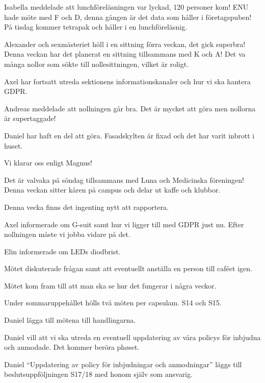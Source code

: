 \documentclass[10pt]{article}
\begin{document}
\begin{paragrafer}
\begin{paragrafer}
		Isabella meddelade att lunchföreläsningen var lyckad, 
		120 personer kom! ENU hade möte med F och D, denna 
		gången är det data som håller i företagspuben! På tisdag kommer 
		tetrapak och håller i en lunchföreläsnig.

		Alexander och sexmästeriet höll i en sittning förra veckan, det gick superbra! 
		Denna veckan har det planerat en sittning tillsammans med 
		K och A! Det va många nollor som sökte till nollesittningen, 
		vilket är roligt.

		Axel har fortsatt utreda sektionens informationskanaler och hur vi ska hantera GDPR. 

		Andreas meddelade att nollningen går bra. Det är mycket att göra men nollorna är supertaggade!

		Daniel har haft en del att göra. Fasadskylten är fixad och det har varit inbrott i huset.

		Vi klarar oss enligt Magnus!
				
		Det är valvaka på söndag tillsammans med Luna och Medicinska föreningen!
	    Denna veckan sitter kåren på campus och delar ut kaffe och klubbor.

				
		Denna vecka finns det ingenting nytt att rapportera.
						
	\end{paragrafer}
		
	Axel informerade om G-suit samt hur vi ligger till med GDPR just nu. Efter nollningen måste vi jobba vidare på det. 
	
	Elin informerade om LEDs diodbrist.

	Mötet diskuterade frågan samt att eventuellt anställa en person till caféet igen.

	Mötet kom fram till att man ska se hur det fungerar i några veckor.

	
	Under sommaruppehållet hölls två möten per capsulam. S14 och S15.

	Daniel \ypa lägga till mötena till handlingarna.

	\Mbaby

	Daniel vill att vi ska utreda en eventuell uppdatering av våra policys för inbjudna och anmodade. Det kommer beröra phøset.

	Daniel \ypa ``Uppdatering av policy för inbjudningar och anmodningar'' läggs till beslutsuppföljningen S17/18 med honom själv som ansvarig.


\end{paragrafer}
\end{document}
